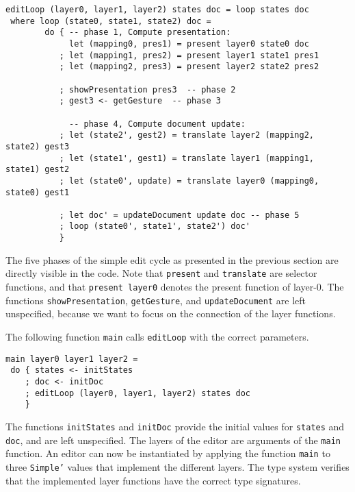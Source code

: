 \begin{small}
\begin{verbatim}
editLoop (layer0, layer1, layer2) states doc = loop states doc
 where loop (state0, state1, state2) doc = 
        do { -- phase 1, Compute presentation:
             let (mapping0, pres1) = present layer0 state0 doc
           ; let (mapping1, pres2) = present layer1 state1 pres1
           ; let (mapping2, pres3) = present layer2 state2 pres2

           ; showPresentation pres3  -- phase 2
           ; gest3 <- getGesture  -- phase 3
 
             -- phase 4, Compute document update: 
           ; let (state2', gest2) = translate layer2 (mapping2, state2) gest3
           ; let (state1', gest1) = translate layer1 (mapping1, state1) gest2
           ; let (state0', update) = translate layer0 (mapping0, state0) gest1
       
           ; let doc' = updateDocument update doc -- phase 5
           ; loop (state0', state1', state2') doc'
           }
\end{verbatim}
\end{small}


The five phases of the simple edit cycle as presented in the previous section are directly visible in the code. Note that \texttt{present} and \texttt{translate} are selector functions, and that \texttt{present layer0} denotes the present function of layer-0. The functions \texttt{showPresentation}, \texttt{getGesture}, and \texttt{updateDocument} are left unspecified, because we want to focus on the connection of the layer functions. 

The following function \texttt{main} calls \texttt{editLoop} with the correct parameters.

\begin{small}
\begin{verbatim}
main layer0 layer1 layer2 = 
 do { states <- initStates
    ; doc <- initDoc 
    ; editLoop (layer0, layer1, layer2) states doc
    }
\end{verbatim}
\end{small}

The functions \texttt{initStates} and \texttt{initDoc} provide the initial values for \texttt{states} and \texttt{doc}, and are left unspecified. The layers of the editor are arguments of the \texttt{main} function. An editor can now be instantiated by applying the function \texttt{main} to three \texttt{Simple'} values that implement the different layers. The type system verifies that the implemented layer functions have the correct type signatures.

